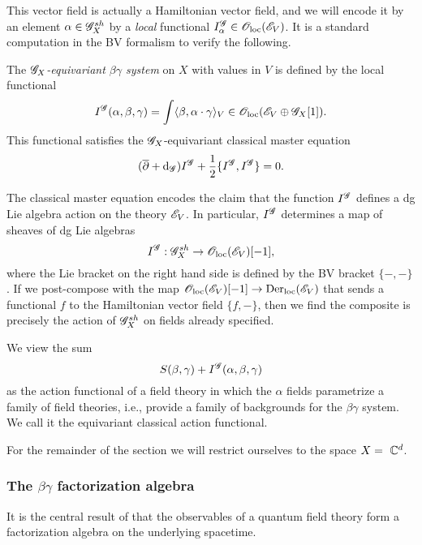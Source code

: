 This vector field is actually a Hamiltonian vector field, 
and we will encode it by an element $\alpha \in \mathscr G_X^{sh}$ by a {\em local} functional $I_\alpha^{\mathscr G} \in {\mathscr O}_{\rm loc}(\mathscr E_V)$. 
It is a standard computation in the BV formalism to verify the following.

\begin{dfn/lem}
The {\em $\mathscr G_X$-equivariant $\beta\gamma$ system} on $X$ with values in $V$ is defined by the local functional
\[
I^{\mathscr G}(\alpha, \beta, \gamma) = \int \langle\beta, \alpha \cdot \gamma\rangle_V \in {\mathscr O}_{\rm loc}(\mathscr E_V \oplus \mathscr G_X[1]) .
\]
This functional satisfies the $\mathscr G_X$-equivariant classical master equation
\[
(\overline{\partial} + {\rm d}_{\mathscr G}) I^{\mathscr G} + \frac{1}{2} \{I^{\mathscr G}, I^{\mathscr G}\} = 0 .
\] 
\end{dfn/lem}

The classical master equation encodes the claim that the function $I^{\mathscr G}$ defines a dg Lie algebra action on the theory $\mathscr E_V$. 
In particular, $I^{\mathscr G}$ determines a map of sheaves of dg Lie algebras 
\[
I^{\mathscr G} : \mathscr G^{sh}_X \to {\mathscr O}_{\rm loc}(\mathscr E_V)[-1],
\] 
where the Lie bracket on the right hand side is defined by the BV bracket $\{-,-\}$. 
If we post-compose with the map ${\mathscr O}_{\rm loc}(\mathscr E_V)[-1] \to {\rm Der}_{\rm loc}(\mathscr E_V)$ that sends a functional $f$ to the Hamiltonian vector field $\{f,-\}$,
then we find the composite is precisely the action of $\mathscr G^{sh}_X$ on fields already specified.

We view the sum 
\[
S(\beta,\gamma) + I^{\mathscr G}(\alpha, \beta, \gamma)
\] 
as the action functional of a field theory in which the $\alpha$ fields parametrize a family of field theories,
i.e., provide a family of backgrounds for the $\beta\gamma$ system.
We call it the equivariant classical action functional.


 For the remainder of the section we will restrict ourselves to the space $X =~\mathbb C^d$. 

\subsubsection{The $\beta\gamma$ factorization algebra}

It is the central result of \cite{CG1,CG2} that the observables of a quantum field theory form a factorization algebra on the underlying spacetime. 

